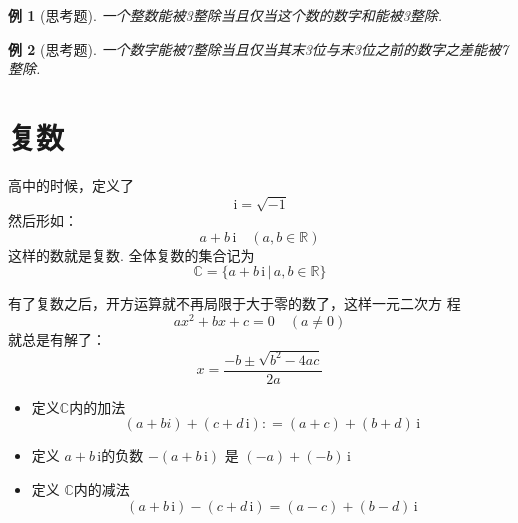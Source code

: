 \documentclass[11pt,punct]{ctexbeamer}
\newtheorem{ex}{例}
\def\i{\, \mathrm{i}}
\begin{document}
\begin{frame}
	\begin{ex}[思考题]
一个整数能被3整除当且仅当这个数的数字和能被3整除.
	\end{ex}

\begin{ex}[思考题]
一个数字能被7整除当且仅当其末3位与末3位之前的数字之差能被7整除.
\end{ex}


\end{frame}


%




\section{复数}
\begin{frame}
	高中的时候，定义了
	\[
	\i=\sqrt{-1}
	\]
	然后形如：
	\[
	a+b \i \quad(a, b \in \mathbb{R})
	\]
	这样的数就是复数.
	全体复数的集合记为
	\[
	\mathbb{C}=\{a+b \i \, | \, a, b \in \mathbb{R}\}
	\]


	有了复数之后，开方运算就不再局限于大于零的数了，这样一元二次方 程
	\[
	a x^{2}+b x+c=0 \quad(a \neq 0)
	\]
	就总是有解了：
	\[
	x=\frac{-b \pm \sqrt{b^{2}-4 a c}}{2 a}
	\]


\end{frame}

\begin{frame}
	\begin{itemize}
		\item 定义$\mathbb{C}$内的加法
		$$(a+b i)+(c+d \i)  : =(a+c)+(b+d) \i $$

		\item 定义 $a+b {\i}$的负数 $-(a+b {\i})${ 是 } $(-a)+(-b) {\i}$

		\item 定义  $\mathbb{C}$内的减法 $$(a+b \i)-(c+d \i) =(a-c)+(b-d) \i $$
	\end{itemize}

\end{frame}
\end{document}
